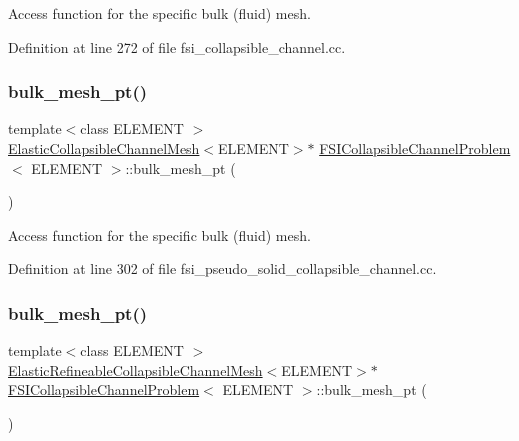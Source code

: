 Access function for the specific bulk (fluid) mesh. 



Definition at line 272 of file fsi\+\_\+collapsible\+\_\+channel.\+cc.

\mbox{\label{classFSICollapsibleChannelProblem_a90bfc02608e7fa6a69b14b6d5cfb939e}} 
\subsubsection{\texorpdfstring{bulk\+\_\+mesh\+\_\+pt()}{bulk\_mesh\_pt()}\hspace{0.1cm}{\footnotesize\ttfamily [5/6]}}
{\footnotesize\ttfamily template$<$class E\+L\+E\+M\+E\+NT $>$ \\
\hyperlink{classElasticCollapsibleChannelMesh}{Elastic\+Collapsible\+Channel\+Mesh}$<$E\+L\+E\+M\+E\+NT$>$$\ast$ \hyperlink{classFSICollapsibleChannelProblem}{F\+S\+I\+Collapsible\+Channel\+Problem}$<$ E\+L\+E\+M\+E\+NT $>$\+::bulk\+\_\+mesh\+\_\+pt (\begin{DoxyParamCaption}{ }\end{DoxyParamCaption})\hspace{0.3cm}{\ttfamily [inline]}}



Access function for the specific bulk (fluid) mesh. 



Definition at line 302 of file fsi\+\_\+pseudo\+\_\+solid\+\_\+collapsible\+\_\+channel.\+cc.

\mbox{\label{classFSICollapsibleChannelProblem_ac08de7f582e4e2d7e6953edd15707d89}} 
\subsubsection{\texorpdfstring{bulk\+\_\+mesh\+\_\+pt()}{bulk\_mesh\_pt()}\hspace{0.1cm}{\footnotesize\ttfamily [6/6]}}
{\footnotesize\ttfamily template$<$class E\+L\+E\+M\+E\+NT $>$ \\
\hyperlink{classElasticRefineableCollapsibleChannelMesh}{Elastic\+Refineable\+Collapsible\+Channel\+Mesh}$<$E\+L\+E\+M\+E\+NT$>$$\ast$ \hyperlink{classFSICollapsibleChannelProblem}{F\+S\+I\+Collapsible\+Channel\+Problem}$<$ E\+L\+E\+M\+E\+NT $>$\+::bulk\+\_\+mesh\+\_\+pt (\begin{DoxyParamCaption}{ }\end{DoxyParamCaption})\hspace{0.3cm}{\ttfamily [inline]}}



